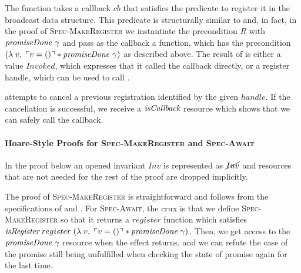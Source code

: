 
The function  takes a callback \(cb\) that satisfies the \gsIsCb{} predicate to register it in the broadcast data structure.
This predicate is structurally similar to \gsIsWaker{} and, in fact, in the proof of \textsc{Spec-MakeRegister} we instantiate the precondition \(R\) with \(\emph{promiseDone}~\gamma{}\) and pass as the callback a  function, which has the precondition \((\lambda\; v,\; \ulcorner v = () \urcorner \ast \emph{promiseDone}~\gamma{})\) as described above.
The result of  is either a value \(Invoked\), which expresses that it called the callback directly, or a register handle, which can be used to call .

 attempts to cancel a previous registration identified by the given \(handle\).
If the cancellation is successful, we receive a \(\emph{isCallback}{}\) resource which shows that we can safely call the callback.

\paragraph*{Hoare-Style Proofs for \textsc{Spec-MakeRegister} and \textsc{Spec-Await}}

In the proof below an opened invariant \(Inv\) is represented as \(\cancel{Inv}\) and resources that are not needed for the rest of the proof are dropped implicitly.

The proof of \textsc{Spec-MakeRegister} is straightforward and follows from the specifications of  and .
For \textsc{Spec-Await}, the crux is that we define \textsc{Spec-MakeRegister} so that it returns a \(register\) function which satisfies \(\emph{isRegister}{}\; register\; (\lambda\; v,\; \ulcorner v = () \urcorner \ast \emph{promiseDone}~\gamma{})\).
Then, we get access to the \(\emph{promiseDone}~\gamma{}\) resource when the \esuspend{} effect returns, and we can refute the case of the promise still being unfulfilled when checking the state of promise again for the last time.

